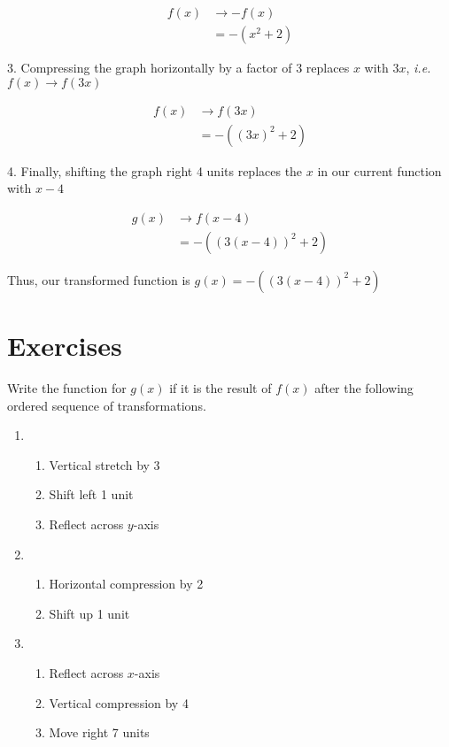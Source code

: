 \begin{align*}
    f(x) &\rightarrow -f(x) \\
    &= -(x^2 + 2) 
\end{align*}

3. Compressing the graph horizontally by a factor of 3 replaces $x$ with $3x$, \textit{i.e.} $f(x) \rightarrow f(3x)$

\begin{align*}
    f(x) &\rightarrow f(3x) \\
    &= -((3x)^2+2)
\end{align*}

4. Finally, shifting the graph right 4 units replaces the $x$ in our current function with $x-4$

\begin{align*}
    g(x) &\rightarrow f(x-4) \\
    &= -((3(x-4))^2+2)
\end{align*}

Thus, our transformed function is $\boxed{g(x) = -((3(x-4))^2+2)}$

\section{Exercises}

Write the function for $g(x)$ if it is the result of $f(x)$ after the following ordered sequence of transformations.
\begin{enumerate}
\item \begin{enumerate}[(1)]
	\item Vertical stretch by 3
	\item Shift left 1 unit
	\item Reflect across $y$-axis
\end{enumerate}
\item \begin{enumerate}[(1)]
	\item Horizontal compression by 2
	\item Shift up 1 unit
\end{enumerate}
\item \begin{enumerate}[(1)]
	\item Reflect across $x$-axis
	\item Vertical compression by 4
	\item Move right 7 units
\end{enumerate}
\setcounter{Review}{\value{enumi}}
\end{enumerate}

